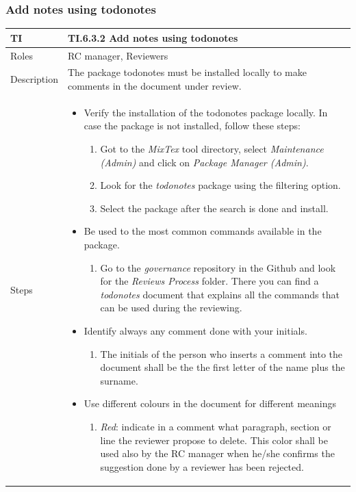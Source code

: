 \documentclass{template/openetcs_article}
\begin{document}
\subsubsection{Add notes using todonotes}

\begin{flushleft}
\tablefirsthead{}
\tablehead{}
\tabletail{}
\tablelasttail{}
\begin{supertabular}{|m{2cm}|m{13cm}|}
\hline
{}
TI & 
TI.6.3.2 Add notes using todonotes
\\\hline
Roles &
RC manager, Reviewers
\\\hline
Description &
The package todonotes must be installed locally to make comments in the document under review. 
\\\hline
Steps &
\begin{itemize}
\item Verify the installation of the todonotes package locally. In case the package is not installed, follow these steps:
\begin{enumerate}
\item Got to the {\it MixTex} tool directory, select {\it Maintenance (Admin)} and click on {\it Package Manager (Admin)}.
\item Look for the {\it todonotes} package using the filtering option.
\item Select the package after the search is done and install.
\end{enumerate}
\item Be used to the most common commands available in the package.
\begin{enumerate}
\item Go to the {\it governance} repository in the Github and look for the {\it Reviews Process} folder. There you can find a {\it todonotes} document that explains all the commands that can be used during the reviewing.
\end{enumerate}
\item Identify always any comment done with your initials.
\begin{enumerate} 
\item The initials of the person who inserts a comment into the document shall be the the first letter of the name plus the surname.
\end{enumerate}
\item Use different colours in the document for different meanings 
\begin{enumerate}
\item {\it Red}: indicate in a comment what paragraph, section or line the reviewer propose to delete. This color shall be used also by the RC manager when he/she confirms the suggestion done by a reviewer has been rejected.

\end{enumerate}
\end{itemize}
\end{supertabular}
\end{flushleft}
\end{document}
